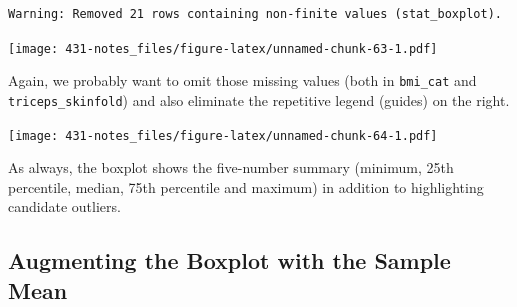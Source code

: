 \documentclass[
]{book}
\newenvironment{Shaded}{\begin{snugshade}}{\end{snugshade}}
\newcommand{\DataTypeTok}[1]{\textcolor[rgb]{0.13,0.29,0.53}{#1}}
\newcommand{\KeywordTok}[1]{\textcolor[rgb]{0.13,0.29,0.53}{\textbf{#1}}}
\newcommand{\NormalTok}[1]{#1}
\newcommand{\OperatorTok}[1]{\textcolor[rgb]{0.81,0.36,0.00}{\textbf{#1}}}
\newcommand{\OtherTok}[1]{\textcolor[rgb]{0.56,0.35,0.01}{#1}}
\newcommand{\StringTok}[1]{\textcolor[rgb]{0.31,0.60,0.02}{#1}}
\begin{document}
\begin{verbatim}
Warning: Removed 21 rows containing non-finite values (stat_boxplot).
\end{verbatim}

\texttt{[image: 431-notes\_files/figure-latex/unnamed-chunk-63-1.pdf]}

Again, we probably want to omit those missing values (both in \texttt{bmi\_cat} and \texttt{triceps\_skinfold}) and also eliminate the repetitive legend (guides) on the right.

\begin{Shaded}
\end{Shaded}

\texttt{[image: 431-notes\_files/figure-latex/unnamed-chunk-64-1.pdf]}

As always, the boxplot shows the five-number summary (minimum, 25th percentile, median, 75th percentile and maximum) in addition to highlighting candidate outliers.

\hypertarget{augmenting-the-boxplot-with-the-sample-mean}{%
\subsection{Augmenting the Boxplot with the Sample Mean}\label{augmenting-the-boxplot-with-the-sample-mean}}
\end{document}
